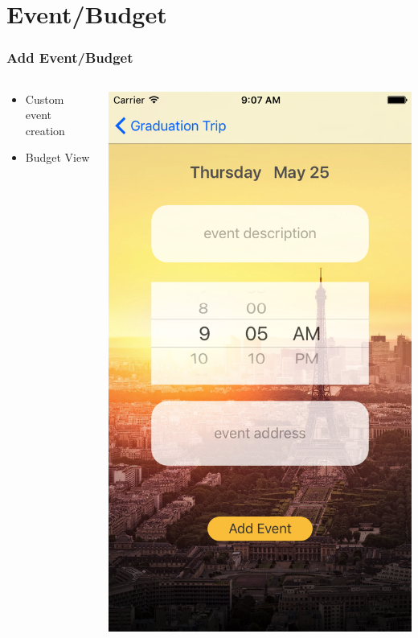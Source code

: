 \documentclass{beamer}
\begin{document}
\section{Event/Budget}
\begin{frame}
\frametitle{Add Event/Budget}
\begin{columns}
    \begin{column}{0.3\textwidth}
        \begin{itemize}
            \item Custom event creation
            \item Budget View
        \end{itemize}
    \end{column}
    \begin{column}{0.3\textwidth}  %
        \begin{center}
            \includegraphics[scale=0.14]{eventCreation}

\end{center}
\end{column}
\end{columns}
\end{frame}
\end{document}
